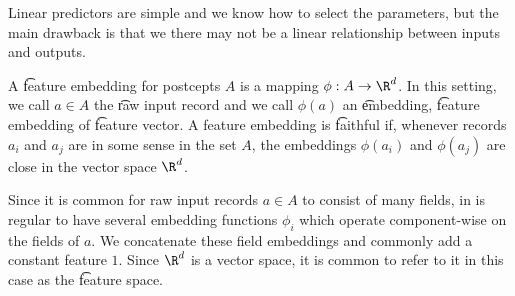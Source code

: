 

Linear predictors are simple and we know how to select the parameters,
but the main drawback is that we there may not be a linear relationship between inputs and outputs.


A \t{feature embedding} for postcepts $A$ is a mapping $\phi: A \to \R^d$.
In this setting, we call $a \in A$ the \t{raw input record} and we call $\phi(a)$ an \t{embedding}, \t{feature embedding} of \t{feature vector}.
A feature embedding is \t{faithful} if, whenever records $a_i$ and $a_j$ are in some sense  in the set $A$, the embeddings $\phi(a_i)$ and $\phi(a_j)$ are close in the vector space $\R^d$.

Since it is common for raw input records $a \in A$ to consist of many fields, in is regular to have several embedding functions $\phi_i$ which operate component-wise on the fields of $a$.
We concatenate these field embeddings and commonly add a constant feature $1$.
Since $\R^d$ is a vector space, it is common to refer to it in this case as the \t{feature space}.

\blankpage
